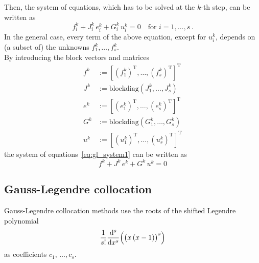 \documentclass{scrartcl}
\begin{document}
Then, the system of equations,
which has to be solved at the $k$-th step,
can be written as
\begin{equation}
	f_i^k + J_i^k \, e_i^k + G_i^k \, u_i^k = 0
	\quad \text{for } i = 1, \ldots, s \,.
	\label{eq:gl_system1}
\end{equation}
In the general case, every term of the above equation,
except for $u_i^k$,
depends on (a subset of) the unknowns $f_1^k, \ldots, f_s^k$. \\

By introducing the block vectors and matrices
\begin{subequations}
	\begin{alignat*}{1}
		f^k &:= {\left[ {\left( f_1^k \right)}^\mathrm{T}, \ldots,
			{\left( f_s^k \right)}^\mathrm{T} \right]}^\mathrm{T} \\
		J^k &:= \mathrm{blockdiag}(J_1^k, \ldots, J_s^k) \\
		e^k &:= {\left[ {\left( e_1^k \right)}^\mathrm{T}, \ldots,
			{\left( e_s^k \right)}^\mathrm{T} \right]}^\mathrm{T} \\
		G^k &:= \mathrm{blockdiag}(G_1^k, \ldots, G_s^k) \\
		u^k &:= {\left[ {\left( u_1^k \right)}^\mathrm{T}, \ldots,
			{\left( u_s^k \right)}^\mathrm{T} \right]}^\mathrm{T}
	\end{alignat*}
\end{subequations}
the system of equations~\eqref{eq:gl_system1} can be written as
\begin{equation*}
	f^k + J^k \, e^k + G^k \, u^k = 0
\end{equation*}


\subsection{Gauss-Legendre collocation}

Gauss-Legendre collocation methods use the roots of the shifted Legendre polynomial
\begin{equation*}
	\frac{1}{s!} \frac{\mathrm{d}^s}{\mathrm{d} x^s} \Bigl( {\bigl( x \left( x - 1 \right) \bigr)}^s \Bigr)
\end{equation*}
as coefficients $c_1, \,\ldots, c_s$.
\end{document}
